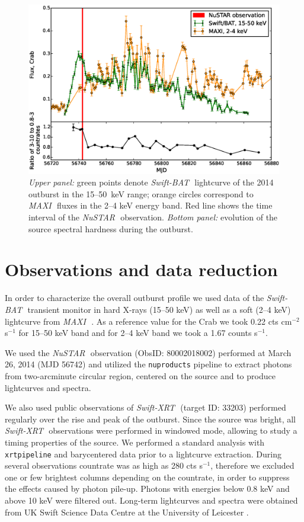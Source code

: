 \documentclass[a4paper,fleqn,usenatbib]{mnras}
\def\swiftx{{\em Swift-XRT\,}}
\def\swiftb{{\em Swift-BAT\,}}
\def\nustar{{\em NuSTAR\,}}
\def\maxi{{\em MAXI\,}}
\begin{document}
\begin{figure}
\centerline{\includegraphics[scale=0.5]{batlc_v06.eps}}
\caption{{\it Upper panel:} green points denote \swiftb\, lightcurve of the 2014 outburst in the 15--50~keV range; orange circles correspond to \maxi\, fluxes in the 2--4 keV energy band.  
Red line shows the time interval of the \nustar\, observation. 
{\it Bottom panel:} evolution of the source spectral hardness during the outburst.} 
\label{fig:batlc}
\end{figure} 

\section{Observations and data reduction}
\label{sec:datared} 
In order to characterize the overall outburst profile we used data of the \swiftb\, transient monitor \citep{krimm13bat} in hard X-rays (15--50 keV) as well as a soft (2--4 keV) lightcurve from \maxi\, \citep{matsuoka13maxi}.  As a reference value for the Crab we took 0.22 cts cm$^{-2}$ s$^{-1}$ for 15--50 keV band and for 2--4 keV band we took a 1.67 counts s$^{-1}$.

We used the \nustar\, observation (ObsID: 80002018002) performed at March 26, 2014 (MJD 56742) and utilized the {\texttt{nuproducts}} pipeline to extract photons from two-arcminute circular region, centered on the source and to produce lightcurves and spectra.

We also used public observations of \swiftx\, (target ID: 33203) performed regularly over the rise and peak of the outburst.  
Since the source was bright, all \swiftx\, observations were performed in windowed mode, allowing to study a timing properties of the source. 
We performed a standard analysis with {\texttt{xrtpipeline}} and barycentered data prior to a lightcurve extraction. 
During several observations countrate was as high as 280 cts s$^{-1}$, therefore we excluded one or few brightest columns depending on the countrate, in order to suppress the effects caused by photon pile-up. 
Photons with energies below 0.8 keV and above 10 keV were filtered out. 
Long-term lightcurves and spectra were obtained from UK Swift Science Data Centre at the University of Leicester \citep{evans09}.
\end{document}
